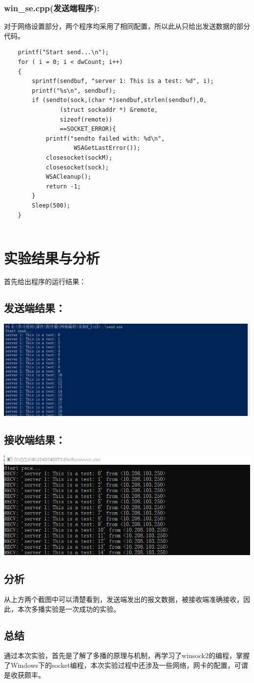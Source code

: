 \documentclass[UTF8]{ctexart}
\begin{document}
\subsubsection{win\_{}se.cpp(发送端程序):}
\par{对于网络设置部分，两个程序均采用了相同配置，所以此从只给出发送数据的部分代码。}
\par{}
\par{
\begin{lstlisting}
	printf("Start send...\n");
	for ( i = 0; i < dwCount; i++)
	{
		sprintf(sendbuf, "server 1: This is a test: %d", i);
		printf("%s\n", sendbuf);
		if (sendto(sock,(char *)sendbuf,strlen(sendbuf),0,
				(struct sockaddr *) &remote,
				sizeof(remote))
				==SOCKET_ERROR){
			printf("sendto failed with: %d\n", 
					WSAGetLastError());
			closesocket(sockM);
			closesocket(sock);
			WSACleanup();
			return -1;
		}
		Sleep(500);
	}
	
\end{lstlisting}
}
\section{实验结果与分析}
\par{首先给出程序的运行结果：\\}
\subsection{发送端结果：}
\par\centerline{\includegraphics[scale=0.4]{fig3.png}}
\subsection{接收端结果：}
\par\centerline{\includegraphics[scale=0.55]{fig2.png}}
\subsection{分析}

\par{从上方两个截图中可以清楚看到，发送端发出的报文数据，被接收端准确接收，因此，本次多播实验是一次成功的实验。}
\subsection{总结}
\par{通过本次实验，首先是了解了多播的原理与机制，再学习了winsock2的编程，掌握了Windows下的socket编程，本次实验过程中还涉及一些网络，网卡的配置，可谓是收获颇丰。}
\end{document}
